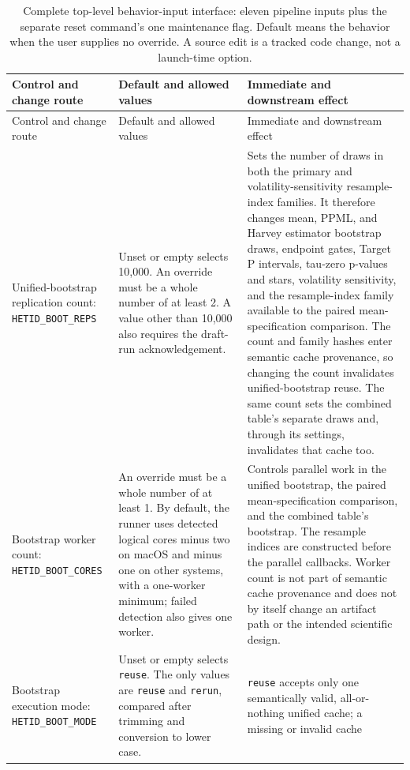 \documentclass[11pt]{article}
\DeclareRobustCommand{\code}[1]{%
  \ifmmode\text{\ttfamily\detokenize{#1}}\else\nolinkurl{#1}\fi}
\begin{document}
\begingroup
\footnotesize
\begin{longtable}{@{}>{\raggedright\arraybackslash}p{}
  >{\raggedright\arraybackslash}p{}
  >{\raggedright\arraybackslash}p{}@{}}
\caption{Complete top-level behavior-input interface: eleven pipeline inputs plus
the separate reset command's one maintenance flag. Default means the behavior when
the user supplies no override. A source edit is a tracked code change, not a
launch-time option.
\label{tab:user-controls}}\\
\toprule
Control and change route & Default and allowed values & Immediate and downstream effect\\
\midrule
\endfirsthead
\toprule
Control and change route & Default and allowed values & Immediate and downstream effect\\
\midrule
\endhead
Unified-bootstrap replication count:
\code{HETID_BOOT_REPS} & Unset or empty selects 10,000. An override must be a
whole number of at least 2. A value other than 10,000 also requires the
draft-run acknowledgement. & Sets the number of draws in both the primary and
volatility-sensitivity resample-index families. It therefore changes mean,
PPML, and Harvey estimator bootstrap draws, endpoint gates, Target P intervals, tau-zero
p-values and stars, volatility sensitivity, and the resample-index family available to
the paired mean-specification comparison. The count and family hashes enter
semantic cache provenance, so changing the count invalidates unified-bootstrap
reuse. The same count sets the combined table's separate draws and, through its
settings, invalidates that cache too.\\
Bootstrap worker count: \code{HETID_BOOT_CORES} & An override must be a whole
number of at least 1. By default, the runner uses detected logical cores minus
two on macOS and minus one on other systems, with a one-worker minimum; failed
detection also gives one worker. & Controls parallel work in the unified
bootstrap, the paired mean-specification comparison, and the combined table's
bootstrap. The resample indices
are constructed before the parallel callbacks. Worker count is not part of
semantic cache provenance and does not by itself change an artifact path or the
intended scientific design.\\
Bootstrap execution mode: \code{HETID_BOOT_MODE} & Unset or empty selects
\code{reuse}. The only values are \code{reuse} and \code{rerun}, compared after
trimming and conversion to lower case. & \code{reuse} accepts only one
semantically valid, all-or-nothing unified cache; a missing or invalid cache

\end{longtable}
\end{document}
